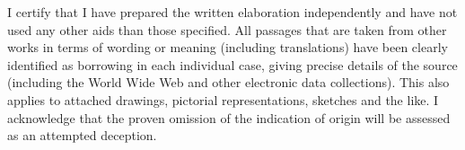 \clearpage %

\noindent

I certify that I have prepared the written elaboration independently and have not used any other aids than those specified. All passages that are taken from other works in terms of wording or meaning (including translations) have been clearly identified as borrowing in each individual case, giving precise details of the source (including the World Wide Web and other electronic data collections). This also applies to attached drawings, pictorial representations, sketches and the like. I acknowledge that the proven omission of the indication of origin will be assessed as an attempted deception.